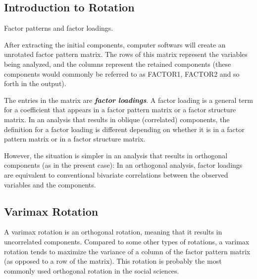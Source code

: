 \documentclass[a4paper,12pt]{article}
\begin{document}
\subsection{Introduction to Rotation}


Factor patterns and factor loadings.

After extracting the initial components, computer softwars
will create an unrotated factor pattern matrix. The rows of this matrix represent the variables
being analyzed, and the columns represent the retained components (these components would commonly be
referred to as FACTOR1, FACTOR2 and so forth in the output).

The entries in the matrix are \textbf{\emph{factor loadings}}. A factor loading is a general term for a coefficient
that appears in a factor pattern matrix or a factor structure matrix. In an analysis that results in
oblique (correlated) components, the definition for a factor loading is different depending on
whether it is in a factor pattern matrix or in a factor structure matrix.

However, the situation is simpler in an analysis that results in orthogonal components (as in the present case): In an
orthogonal analysis, factor loadings are equivalent to conventional bivariate correlations between the observed
variables and the components.


\subsection{Varimax Rotation}
A varimax rotation is an orthogonal rotation, meaning that
it results in uncorrelated components. Compared to some other types of rotations, a varimax
rotation tends to maximize the variance of a column of the factor pattern matrix (as opposed to a
row of the matrix). This rotation is probably the most commonly used orthogonal rotation in the
social sciences.
\end{document}

